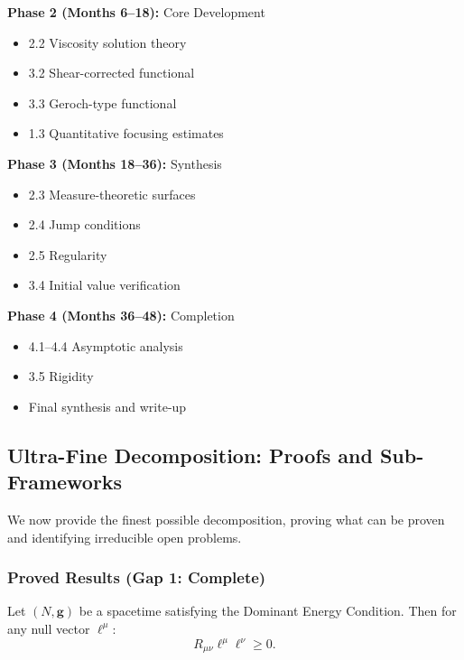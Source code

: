\textbf{Phase 2 (Months 6--18):} Core Development
\begin{itemize}
    \item 2.2 Viscosity solution theory
    \item 3.2 Shear-corrected functional
    \item 3.3 Geroch-type functional
    \item 1.3 Quantitative focusing estimates
\end{itemize}

\textbf{Phase 3 (Months 18--36):} Synthesis
\begin{itemize}
    \item 2.3 Measure-theoretic surfaces
    \item 2.4 Jump conditions
    \item 2.5 Regularity
    \item 3.4 Initial value verification
\end{itemize}

\textbf{Phase 4 (Months 36--48):} Completion
\begin{itemize}
    \item 4.1--4.4 Asymptotic analysis
    \item 3.5 Rigidity
    \item Final synthesis and write-up
\end{itemize}

\subsection{Ultra-Fine Decomposition: Proofs and Sub-Frameworks}\label{subsec:UltraFine}

We now provide the finest possible decomposition, proving what can be proven and identifying irreducible open problems.

\subsubsection{Proved Results (Gap 1: Complete)}

\begin{theorem}\label{thm:DECNEC}
Let $(N, \mathbf{g})$ be a spacetime satisfying the Dominant Energy Condition. Then for any null vector $\ell^\mu$:
\begin{equation}
    R_{\mu\nu}\ell^\mu\ell^\nu \geq 0.
\end{equation}
\end{theorem}

